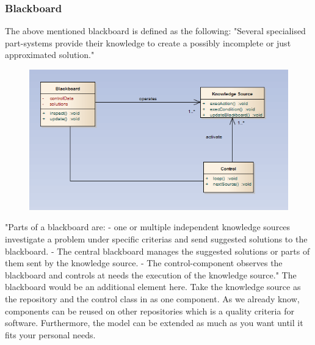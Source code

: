 \subsubsection{Blackboard}
The above mentioned blackboard is defined as the following:
"Several specialised part-systems provide their knowledge to create a possibly incomplete or just approximated solution." \citep{starke_rausch}
\begin{figure}[!hbp]
\includegraphics[scale=1.0]{img/pics/blackboard.PNG}
\caption{ \protect \cite{starke_rausch}}
\label{fig:ref_black}
\end{figure}
"Parts of a blackboard are:
- one or multiple independent knowledge sources investigate a problem under specific criterias and send suggested solutions to the blackboard.
- The central blackboard manages the suggested solutions or parts of them sent by the knowledge source.
- The control-component observes the blackboard and controls at needs the execution of the knowledge source." \citep{starke_rausch}\linebreak
The blackboard would be an additional element here. Take the knowledge source as the repository and the control class in  as one component. As we already know, components can be reused on other repositories which is a quality criteria for software. Furthermore, the model can be extended as much as you want until it fits your personal needs. 
\pagebreak
